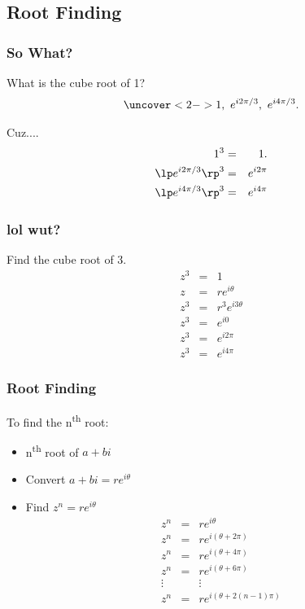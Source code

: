 \subsection{Root Finding}

\begin{frame}
  \frametitle{So What?}

  What is the cube root of 1?
  \begin{eqnarray*}
    \uncover<2->{1,~e^{i2\pi/3},~e^{i4\pi/3}}.
  \end{eqnarray*}

  {
    Cuz....
    \begin{eqnarray*}
      1^3 & = & 1. \\
      \lp e^{i2\pi/3} \rp^3 & = &  e^{i2\pi} \\
      \lp e^{i4\pi/3} \rp^3 & = & e^{i4\pi}
    \end{eqnarray*}

  }

  
\end{frame}

\begin{frame}
  \frametitle{lol wut?}

  Find the cube root of 3.
  \begin{eqnarray*}
    z^3 & = & 1 \\
    z & = & r e^{i\theta} \\
    z^3 & = & r^3 e^{i3\theta} \\
    z^3 & = & e^{i0} \\
    z^3 & = & e^{i2\pi} \\
    z^3 & = & e^{i4\pi}
  \end{eqnarray*}
  
\end{frame}

\begin{frame}
  \frametitle{Root Finding}
  To find the n\textsuperscript{th} root:
  \begin{itemize}
  \item n\textsuperscript{th} root of $a+bi$
  \item Convert $a+bi=re^{i\theta}$ 
  \item Find $z^n=re^{i\theta}$
    \begin{eqnarray*}
      z^n & = & re^{i\theta} \\
      z^n & = & re^{i(\theta+2\pi)} \\
      z^n & = & re^{i(\theta+4\pi)} \\
      z^n & = & re^{i(\theta+6\pi)} \\
      \vdots & & \vdots \\
      z^n & = & re^{i(\theta+2(n-1)\pi)} \\
    \end{eqnarray*}
  \end{itemize}
\end{frame}

